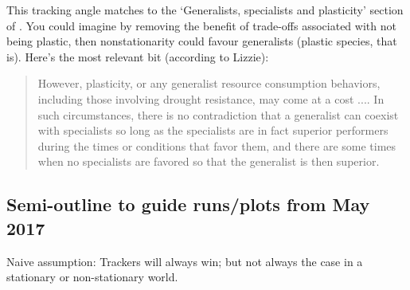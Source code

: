 \documentclass[11pt,letterpaper]{article}
\begin{document}
\noindent This tracking angle matches to the `Generalists, specialists and plasticity' section of \citet{Chesson:2004eo}. You could imagine by removing the benefit of trade-offs associated with not being plastic, then nonstationarity could favour generalists (plastic species, that is). Here's the most relevant bit (according to Lizzie):
\begin{quote}
However, plasticity, or any generalist resource consumption
behaviors, including those involving drought resistance,
may come at a cost .... In such circumstances, there is no
contradiction that a generalist can coexist with specialists
so long as the specialists are in fact superior performers
during the times or conditions that favor them, and there 
are some times when no specialists are favored so that the
generalist is then superior.
\end{quote}





\subsection{Semi-outline to guide runs/plots from May 2017} Naive assumption: Trackers will always win; but not always the case in a stationary or non-stationary world. 
\end{document}
